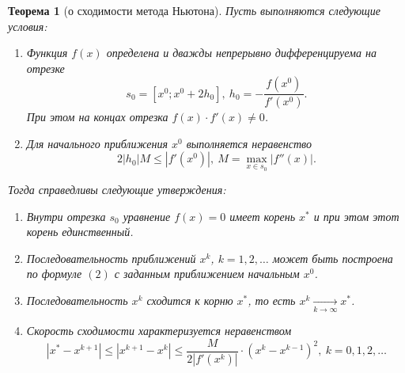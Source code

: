 \documentclass[a4paper, 12pt]{report}
\numberwithin{equation}{section}
\renewcommand{\leq}{\leqslant}
\newtheorem*{theorem}{Теорема}
\begin{document}
	\begin{theorem}
		[о сходимости метода Ньютона]
		Пусть выполняются следующие условия:
		\begin{enumerate}
			\item Функция $f(x)$ определена и дважды непрерывно дифференцируема на отрезке $$s_0 = [x^0; x^0 + 2h_0],\ h_0 =- \dfrac{f(x^0)}{f'(x^0)}.$$
			При этом на концах отрезка $f(x)\cdot f'(x)\ne 0$.
			\item Для начального приближения $x^0$ выполняется неравенство $$2|h_0|M \leq |f'(x^0)|,\ M = \underset{x\in s_0}{\max}|f''(x)|.$$
		\end{enumerate}
		Тогда справедливы следующие утверждения: \begin{enumerate}
			\item Внутри отрезка $s_0$ уравнение $f(x) = 0$ имеет корень $x^*$ и при этом этот корень единственный.
			\item Последовательность приближений $x^k$, $k=1,2,\ldots$ может быть построена по формуле $(2)$ с заданным приближением начальным $x^0$.
			\item Последовательность $x^k$ сходится к корню $x^*$, то есть $x^k \xrightarrow[k\to\infty]{}x^*$.
			\item Скорость сходимости характеризуется неравенством \begin{equation}
				|x^* - x^{k+1}|\leq |x^{k+1} - x^k|\leq \dfrac{M}{2|f'(x^k)|}\cdot (x^k-x^{k-1})^2,\ k=0,1,2,\ldots
			\end{equation}
		\end{enumerate}
	\end{theorem}
\end{document}
